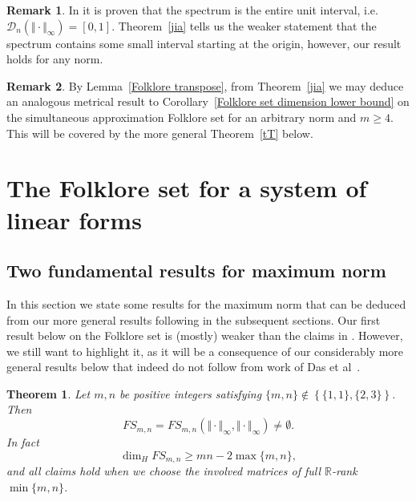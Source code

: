 \documentclass[10pt]{amsart}
\newtheorem{theorem}{Theorem}[section]
\theoremstyle{definition}
\newtheorem{remark}{Remark}
\newcommand{\R}{\mathbb{R}}
\begin{document}
\begin{remark}
In \cite{j2} it is proven that the spectrum is the entire unit interval, i.e. $\mathcal{D}_n(\Vert\cdot\Vert_{\infty})=[0,1]$. Theorem~\ref{jia} tells us the weaker statement that the spectrum contains some small interval starting at the origin, however, our result holds for any norm. 
\end{remark}

\begin{remark}
By Lemma~\ref{Folklore transpose}, from Theorem~\ref{jia} we may deduce an analogous metrical result to Corollary~\ref{Folklore set dimension lower bound} on the simultaneous approximation Folklore set 
for an arbitrary norm and $m\ge 4$.
This will be covered by the more general Theorem~\ref{tT} below.
\end{remark}


\section{The Folklore set  for a system of linear forms } \label{matrix results}


\subsection{Two fundamental results for maximum norm} \label{Sek3.1}

In this section we state some
results for the maximum norm that can be deduced from 
our more general results following in the subsequent sections. Our first result below on the Folklore set
is (mostly) weaker than the claims in \cite{Dasetal}. However, we still want to highlight it, as it will be a consequence of our considerably more general results below that indeed do not follow from work of Das et al~\cite{Dasetal}.

\begin{theorem} \label{non-empty main}
    Let $m,n$ be positive integers 
    satisfying $\{ m,n\}\notin \left\{ \{1,1\}, \{2,3\} \right\}$. Then
    \[
    FS_{m,n}=FS_{m,n}(\Vert \cdot\Vert_{\infty},\Vert \cdot\Vert_{\infty}) \ne \emptyset.
    \]
      In fact
      \[
      \dim_H FS_{m,n} \geq mn-2\max\{m,n\},
      \]
      and all claims hold when we choose the involved matrices
    of full $\R$-rank $\min\{m,n\}$.
\end{theorem}
\end{document}
